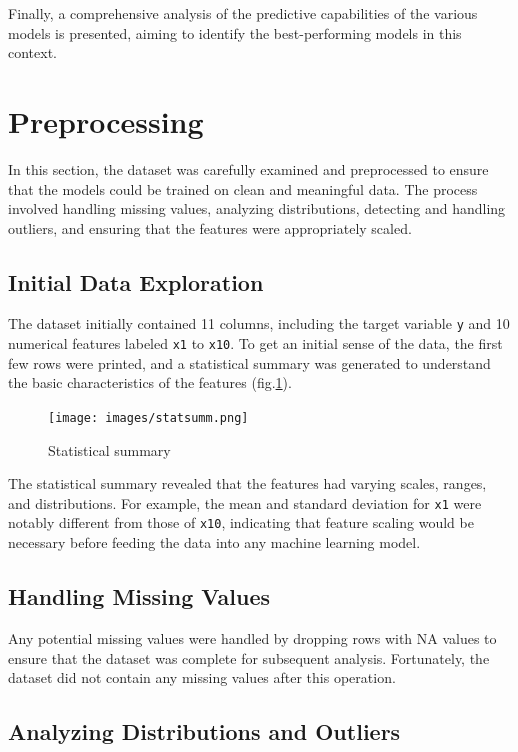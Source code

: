 \documentclass[a4paper, 10pt]{article}
\begin{document}
Finally, a comprehensive analysis of the predictive capabilities of the various models is presented, aiming to identify the best-performing models in this context.


\newpage
\section{Preprocessing}

In this section, the dataset was carefully examined and preprocessed to ensure that the models could be trained on clean and meaningful data. The process involved handling missing values, analyzing distributions, detecting and handling outliers, and ensuring that the features were appropriately scaled.

\subsection{Initial Data Exploration}

The dataset initially contained 11 columns, including the target variable \texttt{y} and 10 numerical features labeled \texttt{x1} to \texttt{x10}. To get an initial sense of the data, the first few rows were printed, and a statistical summary was generated to understand the basic characteristics of the features (fig.\ref{fig:mesh1}).


\begin{figure}[H]
    \centering
    \texttt{[image: images/statsumm.png]}
    \caption{Statistical summary}
    \label{fig:mesh1}
\end{figure}

The statistical summary revealed that the features had varying scales, ranges, and distributions. For example, the mean and standard deviation for \texttt{x1} were notably different from those of \texttt{x10}, indicating that feature scaling would be necessary before feeding the data into any machine learning model.

\subsection{Handling Missing Values}

Any potential missing values were handled by dropping rows with NA values to ensure that the dataset was complete for subsequent analysis. Fortunately, the dataset did not contain any missing values after this operation.


\subsection{Analyzing Distributions and Outliers}
\end{document}
